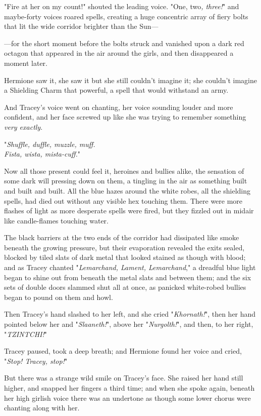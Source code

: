 "Fire at her on my count!" shouted the leading voice. "One, two\emph{, three!}"
and maybe-forty voices roared spells, creating a huge concentric array of fiery
bolts that lit the wide corridor brighter than the Sun---

---for the short moment before the bolts struck and vanished upon a dark red
octagon that appeared in the air around the girls, and then disappeared a
moment later.

Hermione saw it, she saw it but she still couldn't imagine it; she couldn't
imagine a Shielding Charm that powerful, a spell that would withstand an army.

And Tracey's voice went on chanting, her voice sounding louder and more
confident, and her face screwed up like she was trying to remember something
\emph{very exactly}.

"\emph{Shuffle, duffle, muzzle, muff.\\
Fista, wista, mista-cuff.}"

Now all those present could feel it, heroines and bullies alike, the sensation
of some dark will pressing down on them, a tingling in the air as something
built and built and built. All the blue hazes around the white robes, all the
shielding spells, had died out without any visible hex touching them. There
were more flashes of light as more desperate spells were fired, but they
fizzled out in midair like candle-flames touching water.

The black barriers at the two ends of the corridor had dissipated like smoke
beneath the growing pressure, but their evaporation revealed the exits sealed,
blocked by tiled slats of dark metal that looked stained as though with blood;
and as Tracey chanted "\emph{Lemarchand, Lament, Lemarchand}," a dreadful blue
light began to shine out from beneath the metal slats and between them; and the
six sets of double doors slammed shut all at once, as panicked white-robed
bullies began to pound on them and howl.

Then Tracey's hand slashed to her left, and she cried "\emph{Khornath!}", then
her hand pointed below her and "\emph{Slaaneth!}", above her
"\emph{Nurgolth!}", and then, to her right, "\emph{TZINTCHI!}"

Tracey paused, took a deep breath; and Hermione found her voice and cried,
"\emph{Stop! Tracey, stop!}"

But there was a strange wild smile on Tracey's face. She raised her hand still
higher, and snapped her fingers a third time; and when she spoke again, beneath
her high girlish voice there was an undertone as though some lower chorus were
chanting along with her.

